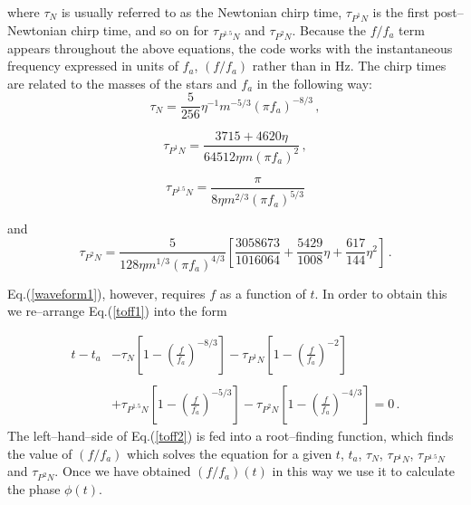 \documentclass[12pt]{article}
\begin{document}
where $\tau_{N}$ is usually referred to as the Newtonian chirp time, $\tau_{P^{1}N}$ is the first post--Newtonian chirp time, and so on for $\tau_{P^{1.5}N}$ and $\tau_{P^{2}N}$. Because the $f/f_{a}$ term appears throughout the above equations, the code works with the instantaneous frequency expressed in units of $f_{a}$, $(f/f_{a})$ rather than in Hz. The chirp times are related to the masses of the stars and $f_{a}$ in the following way:
\begin{equation}
\tau_{N} = \frac{5}{256} \eta^{-1} m^{-5/3} (\pi f_{a})^{-8/3} \,,
\end{equation}

\begin{equation}
\tau_{P^{1}N} = \frac{3715+4620 \eta}{64512 \eta m (\pi f_{a})^{2}} \,,
\end{equation}

\begin{equation}
\tau_{P^{1.5}N} = \frac{\pi}{8 \eta m^{2/3} (\pi f_{a})^{5/3}}
\end{equation}

and
\begin{equation}
\tau_{P^{2}N} = \frac{5}{128 \eta m^{1/3} (\pi f_{a})^{4/3}} \left[ \frac{3058673}{1016064} + \frac{5429}{1008} \eta + \frac{617}{144} \eta^{2} \right] \,.
\end{equation}




Eq.(\ref{waveform1}), however, requires $f$ as a function of $t$. In order to obtain this we re--arrange Eq.(\ref{toff1})  into the form

\begin{equation}
\begin{split}
t - t_{a} & - \tau_{N} \left[ 1 - \left( \frac{f}{f_{a}} \right)^{-8/3} \right] - \tau_{P^{1}N} \left[ 1 - \left( \frac{f}{f_{a}} \right)^{-2} \right] \\
          &     \\
          & + \tau_{P^{1.5}N} \left[ 1 - \left( \frac{f}{f_{a}} \right)^{-5/3} \right] - \tau_{P^{2}N} \left[ 1 - \left( \frac{f}{f_{a}} \right)^{-4/3} \right] = 0 \,.
\end{split}
\label{toff2}
\end{equation}
The left--hand--side of Eq.(\ref{toff2}) is fed into a root--finding function,  which finds the value of $(f/f_{a})$ which solves the equation for a given $t$, $t_{a}$, $\tau_{N}$, $\tau_{P^{1}N}$, $\tau_{P^{1.5}N}$ and $\tau_{P^{2}N}$.
Once we have obtained $(f/f_{a})(t)$ in this way we use it to calculate the phase $\phi(t)$. 
\end{document}
